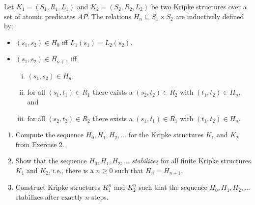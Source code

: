 
Let $K_1 = (S_1, R_1, L_1)$ and  $K_2 = (S_2, R_2, L_2)$ be two Kripke structures over a set of atomic predicates $\mathit{AP}$.
The relations $H_n \subseteq S_1 \times S_2$ are inductively defined by:
\begin{itemize}
\item $(s_1,s_2) \in H_0$ iff $L_1(s_1) = L_2(s_2)$.
\item $(s_1,s_2) \in H_{n+1}$ iff
    \begin{enumerate}[(i)]
    \item $(s_1,s_2) \in H_n$,
    \item for all $(s_1,t_1) \in R_1$ there exists a $(s_2,t_2) \in R_2$ with $(t_1,t_2) \in H_n$, and
    \item for all $(s_2,t_2) \in R_2$ there exists a $(s_1,t_1) \in R_1$ with $(t_1,t_2) \in H_n$.
    \end{enumerate}
\end{itemize}

\begin{enumerate}

	\item Compute the sequence $H_0, H_1, H_2,\ldots$ for the Kripke structures $K_1$ and $K_2$ from Exercise 2.
    
	\item Show that the sequence $H_0, H_1, H_2,\ldots$ \emph{stabilizes} for all finite Kripke structures $K_1$ and $K_2$, i.e., there is a $n \ge 0$ such that $H_n = H_{n+1}$.
    
	\item Construct Kripke structures $K_1^n$ and $K_2^n$ such that the sequence $H_0, H_1, H_2,\ldots$ stabilizes after exactly $n$ steps.

\end{enumerate}
